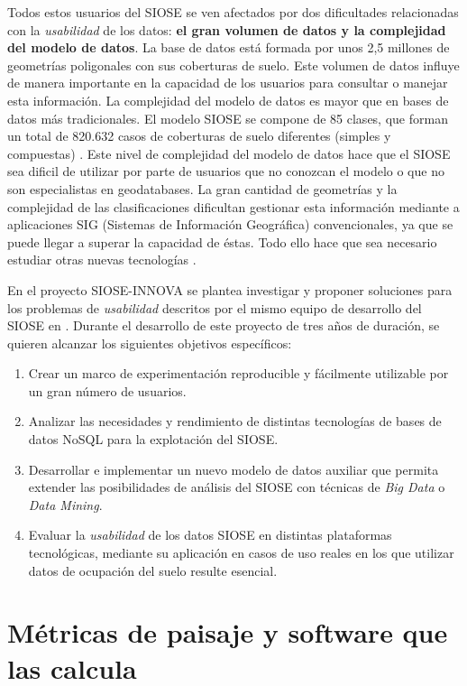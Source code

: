 Todos estos usuarios del SIOSE se ven afectados por dos dificultades relacionadas con la \textit{usabilidad} de los datos: \textbf{el gran volumen de datos y la complejidad del modelo de datos}. La base de datos está formada por unos 2,5 millones de geometrías poligonales con sus coberturas de suelo. Este volumen de datos influye de manera importante en la capacidad de los usuarios para consultar o manejar esta información. La complejidad del modelo de datos es mayor que en bases de datos más tradicionales. El modelo SIOSE se compone de 85 clases, que forman un total de 820.632 casos de coberturas de suelo diferentes (simples y compuestas) \citep{FernandezVillarino2012}. Este nivel de complejidad del modelo de datos hace que el SIOSE sea dificil de utilizar por parte de usuarios que no conozcan el modelo o que no son especialistas en geodatabases. La gran cantidad de geometrías y la complejidad de las clasificaciones dificultan gestionar esta información mediante a aplicaciones SIG (Sistemas de Información Geográfica) convencionales, ya que se puede llegar a superar la capacidad de éstas. Todo ello hace que sea necesario estudiar otras nuevas tecnologías \citep{NavarroCarrion2016}.

En el proyecto SIOSE-INNOVA se plantea investigar y proponer soluciones para los problemas de \textit{usabilidad} descritos por el mismo equipo de desarrollo del SIOSE en \citet{FernandezVillarino2012}. Durante el desarrollo de este proyecto de tres años de duración, se quieren alcanzar los siguientes objetivos específicos:
\begin{enumerate}
\item Crear un marco de experimentación reproducible y fácilmente utilizable por un gran número de usuarios.
\item Analizar las necesidades y rendimiento de distintas tecnologías de bases de datos NoSQL para la explotación del SIOSE.
\item Desarrollar e implementar un nuevo modelo de datos auxiliar que permita extender las posibilidades de análisis del SIOSE con técnicas de \textit{Big Data} o \textit{Data Mining}.
\item Evaluar la \textit{usabilidad} de los datos SIOSE en distintas plataformas tecnológicas, mediante su aplicación en casos de uso reales en los que utilizar datos de ocupación del suelo resulte esencial.
\end{enumerate}


\section{Métricas de paisaje y software que las calcula}\label{sec:metrica}

